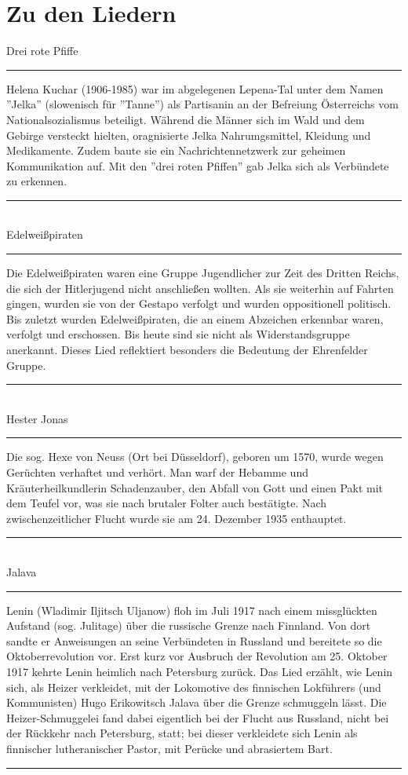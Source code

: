 \section*{Zu den Liedern}


Drei rote Pfiffe\\[-0.5em]
\noindent\rule{\textwidth}{0.2pt}
Helena Kuchar (1906-1985) war im abgelegenen Lepena-Tal unter dem Namen ''Jelka'' (slowenisch für ''Tanne'') als Partisanin an der Befreiung Österreichs vom Nationalsozialismus beteiligt.
Während die Männer sich im Wald und dem Gebirge versteckt hielten, oragnisierte Jelka Nahrumgsmittel, Kleidung und Medikamente.
Zudem baute sie ein Nachrichtennetzwerk zur geheimen Kommunikation auf. Mit den ''drei roten Pfiffen'' gab Jelka sich als Verbündete zu erkennen. \\[-0.5em]
\noindent\rule{\textwidth}{0.2pt} \\

Edelweißpiraten\\[-0.5em]
\noindent\rule{\textwidth}{0.2pt}
Die Edelweißpiraten waren eine Gruppe Jugendlicher zur Zeit des Dritten Reichs, die sich der Hitlerjugend nicht anschließen wollten.
Als sie weiterhin auf Fahrten gingen, wurden sie von der Gestapo verfolgt und wurden oppositionell politisch.
Bis zuletzt wurden Edelweißpiraten, die an einem Abzeichen erkennbar waren, verfolgt und erschossen.
Bis heute sind sie nicht als Widerstandsgruppe anerkannt. Dieses Lied reflektiert besonders die Bedeutung der Ehrenfelder Gruppe. \\[-0.5em]
\noindent\rule{\textwidth}{0.2pt} \\

Hester Jonas\\[-0.5em]
\noindent\rule{\textwidth}{0.2pt}
Die sog. Hexe von Neuss (Ort bei Düsseldorf), geboren um 1570, wurde wegen Gerüchten verhaftet und verhört.
Man warf der Hebamme und Kräuterheilkundlerin Schadenzauber, den Abfall von Gott und einen Pakt mit dem Teufel vor, was sie nach brutaler Folter auch bestätigte.
Nach zwischenzeitlicher Flucht wurde sie am 24. Dezember 1935 enthauptet. \\[-0.5em]
\noindent\rule{\textwidth}{0.2pt} \\

Jalava\\[-0.5em]
\noindent\rule{\textwidth}{0.2pt}
Lenin (Wladimir Iljitsch Uljanow) floh im Juli 1917 nach einem missglückten Aufstand (sog. Julitage) über die russische Grenze nach Finnland.
Von dort sandte er Anweisungen an seine Verbündeten in Russland und bereitete so die Oktoberrevolution vor.
Erst kurz vor Ausbruch der Revolution am 25. Oktober 1917 kehrte Lenin heimlich nach Petersburg zurück.
Das Lied erzählt, wie Lenin sich, als Heizer verkleidet, mit der Lokomotive des finnischen Lokführers (und Kommunisten) Hugo Erikowitsch Jalava über die Grenze schmuggeln lässt.
Die Heizer-Schmuggelei fand dabei eigentlich bei der Flucht aus Russland, nicht bei der Rückkehr nach Petersburg, statt; bei dieser verkleidete sich Lenin als finnischer lutheranischer Pastor, mit Perücke und abrasiertem Bart. \\[-0.5em]
\noindent\rule{\textwidth}{0.2pt}